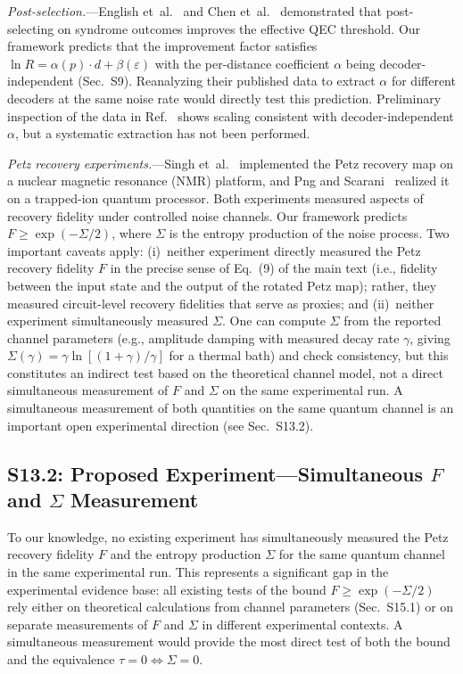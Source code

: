 \documentclass[prl,twocolumn,superscriptaddress,longbibliography]{revtex4-2}
\newcommand{\tauasym}{\tau}
\begin{document}
\emph{Post-selection.}---English et~al.~\cite{EnglishWilliamsonBartlett2025}
and Chen et~al.~\cite{ChenEtAl2025} demonstrated that post-selecting
on syndrome outcomes improves the effective QEC threshold. Our framework
predicts that the improvement factor satisfies
$\ln R = \alpha(p)\cdot d + \beta(\varepsilon)$ with the
per-distance coefficient $\alpha$ being decoder-independent
(Sec.~S9). Reanalyzing their published data to extract $\alpha$
for different decoders at the same noise rate would directly test
this prediction. Preliminary inspection of the data in
Ref.~\cite{ChenEtAl2025} shows scaling consistent with
decoder-independent $\alpha$, but a systematic extraction has not
been performed.

\emph{Petz recovery experiments.}---Singh et~al.~\cite{Singh2025}
implemented the Petz recovery map on a nuclear magnetic resonance
(NMR) platform, and Png and Scarani~\cite{Png2025} realized it on a
trapped-ion quantum processor. Both experiments measured aspects of
recovery fidelity under controlled noise channels.
Our framework predicts $F \geq \exp(-\Sigma/2)$, where $\Sigma$ is
the entropy production of the noise process. Two important caveats
apply: (i)~neither experiment directly measured the Petz recovery
fidelity $F$ in the precise sense of Eq.~(9) of the main text
(i.e., fidelity between the input state and the output of the
rotated Petz map); rather, they measured circuit-level recovery
fidelities that serve as proxies; and (ii)~neither experiment
simultaneously measured $\Sigma$. One can compute $\Sigma$ from
the reported channel parameters (e.g., amplitude damping with
measured decay rate $\gamma$, giving
$\Sigma(\gamma) = \gamma \ln[(1+\gamma)/\gamma]$ for a thermal bath)
and check consistency, but this constitutes an indirect test based on
the theoretical channel model, not a direct simultaneous measurement
of $F$ and $\Sigma$ on the same experimental run. A simultaneous
measurement of both quantities on the same quantum channel is an
important open experimental direction (see Sec.~S13.2).

\subsection{S13.2: Proposed Experiment---Simultaneous $F$ and $\Sigma$ Measurement}

To our knowledge, no existing experiment has simultaneously measured
the Petz recovery fidelity $F$ and the entropy production $\Sigma$ for
the same quantum channel in the same experimental run.
This represents a significant gap in the experimental evidence base:
all existing tests of the bound $F \geq \exp(-\Sigma/2)$ rely either on
theoretical calculations from channel parameters (Sec.~S15.1) or on
separate measurements of $F$ and $\Sigma$ in different experimental
contexts. A simultaneous measurement would provide the most direct
test of both the bound and the equivalence $\tauasym = 0
\Leftrightarrow \Sigma = 0$.
\end{document}

